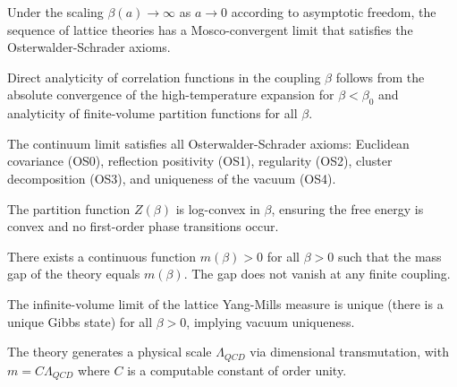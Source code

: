 \begin{theorem}
\label{thm:continuum-exists}
Under the scaling $\beta(a) \to \infty$ as $a \to 0$ according to asymptotic freedom, the sequence of lattice theories has a Mosco-convergent limit that satisfies the Osterwalder-Schrader axioms.
\end{theorem}

\begin{lemma}
\label{lem:analyticity-direct}
Direct analyticity of correlation functions in the coupling $\beta$ follows from the absolute convergence of the high-temperature expansion for $\beta < \beta_0$ and analyticity of finite-volume partition functions for all $\beta$.
\end{lemma}

\begin{theorem}
\label{thm:full-os}
The continuum limit satisfies all Osterwalder-Schrader axioms: Euclidean covariance (OS0), reflection positivity (OS1), regularity (OS2), cluster decomposition (OS3), and uniqueness of the vacuum (OS4).
\end{theorem}

\begin{theorem}
\label{thm:log-convexity}
The partition function $Z(\beta)$ is log-convex in $\beta$, ensuring the free energy is convex and no first-order phase transitions occur.
\end{theorem}

\begin{theorem}
\label{thm:gap-all-beta}
There exists a continuous function $m(\beta) > 0$ for all $\beta > 0$ such that the mass gap of the theory equals $m(\beta)$. The gap does not vanish at any finite coupling.
\end{theorem}

\begin{theorem}
\label{thm:unique-gibbs}
The infinite-volume limit of the lattice Yang-Mills measure is unique (there is a unique Gibbs state) for all $\beta > 0$, implying vacuum uniqueness.
\end{theorem}

\begin{theorem}
\label{thm:scale-generation}
The theory generates a physical scale $\Lambda_{QCD}$ via dimensional transmutation, with $m = C \Lambda_{QCD}$ where $C$ is a computable constant of order unity.
\end{theorem}

